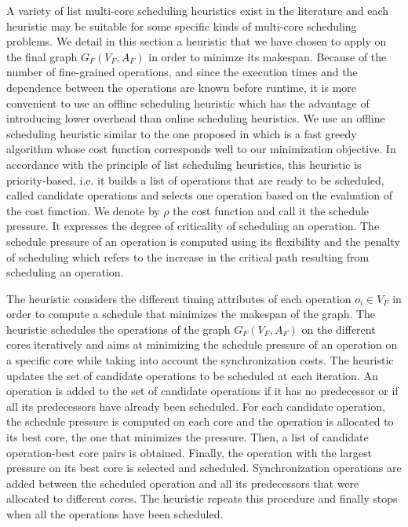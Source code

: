 A variety of list multi-core scheduling heuristics exist in the literature and each heuristic may be suitable for some specific kinds of multi-core scheduling problems. We detail in this section a heuristic that we have chosen to apply on the final graph $G_F(V_F,A_F)$ in order to minimze its makespan. Because of the number of fine-grained operations, and since the execution times and the dependence between the operations are known before runtime, it is more convenient to use an offline scheduling heuristic which has the advantage of introducing lower overhead than online scheduling heuristics. We use an offline scheduling heuristic similar to the one proposed in \cite{grandpierre:1999} which is a fast greedy algorithm whose cost function corresponds well to our minimization objective. In accordance with the principle of list scheduling heuristics, this heuristic is priority-based, i.e. it builds a list of operations that are ready to be scheduled, called candidate operations and selects one operation based on the evaluation of the cost function. We denote by $\rho$ the cost function and call it the schedule pressure. It expresses the degree of criticality of scheduling an operation. The schedule pressure of an operation is computed using its flexibility and the penalty of scheduling which refers to the increase in the critical path resulting from scheduling an operation.  

The heuristic considers the different timing attributes of each operation $o_i \in V_F$ in order to compute a schedule that minimizes the makespan of the graph. The heuristic schedules the operations of the graph $G_F(V_F,A_F)$ on the different cores iteratively and aims at minimizing the schedule pressure of an operation on a specific core while taking into account the synchronization costs. %
The heuristic updates the set of candidate operations to be scheduled at each iteration. An operation is added to the set of candidate operations if it has no predecessor or if all its predecessors have already been scheduled. For each candidate operation, the schedule pressure is computed on each core and the operation is allocated to its best core, the one that minimizes the pressure. Then, a list of candidate operation-best core pairs is obtained. Finally, the operation with the largest pressure on its best core is selected and scheduled. Synchronization operations are added between the scheduled operation and all its predecessors that were allocated to different cores. The heuristic repeats this procedure and finally stops when all the operations have been scheduled.   

